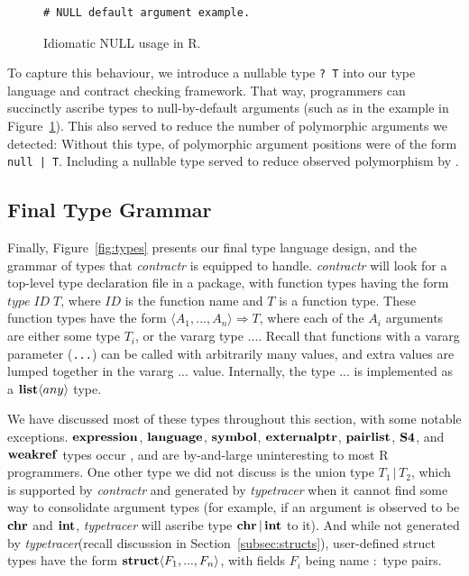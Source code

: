 \documentclass[acmsmall,review,anonymous]{acmart}\settopmatter{printfolios=true,printccs=false,printacmref=false}
\newcommand{\code}[1]{{\lstinline[style=Rin]!#1!}\xspace}
\newcommand{\contractr}{\emph{contractr}\xspace} %
\newcommand{\typetracer}{\emph{typetracer}\xspace} %
\begin{document}
\begin{figure}[htbp]
\begin{center}

\begin{lstlisting}
# NULL default argument example. 
\end{lstlisting}

\caption{Idiomatic NULL usage in R.}
\label{fig:null}
\end{center}
\end{figure}

To capture this behaviour, we introduce a nullable type \code{? T} into our type language and contract checking framework.
That way, programmers can succinctly ascribe types to null-by-default arguments (such as in the example in Figure~\ref{fig:null}).
This also served to reduce the number of polymorphic arguments we detected:
Without this type,  of polymorphic argument positions were of the form \code{null | T}.
Including a nullable type served to reduce observed polymorphism by . 

%
%
%
%
\subsection{Final Type Grammar}

Finally, Figure~\ref{fig:types} presents our final type language design, and the grammar of types that \contractr is equipped to handle.
\contractr will look for a top-level type declaration file in a package, with function types having the form $type \; ID \; T$, where $ID$ is the function name and $T$ is a function type.
These function types have the form $\langle A_1 , ..., A_n\rangle \Rightarrow T$, where each of the $A_i$ arguments are either some type $T_i$, or the vararg type $...$.
Recall that functions with a vararg parameter (\code{...}) can be called with arbitrarily many values, and extra values are lumped together in the vararg $...$ value.
Internally, the type $...$ is implemented as a ${\bf list} \langle any \rangle$ type.

We have discussed most of these types throughout this section, with some notable exceptions.
${\bf expression}$, ${\bf language}$, ${\bf symbol}$, ${\bf externalptr}$, ${\bf pairlist}$, ${\bf S4}$, and ${\bf weakref}$ types occur , and are by-and-large uninteresting to most R programmers.
One other type we did not discuss is the union type $T_1 \, | \, T_2$, which is supported by \contractr and generated by \typetracer when it cannot find some way to consolidate argument types (for example, if an argument is observed to be ${\bf chr}$ and ${\bf int}$, \typetracer will ascribe type ${\bf chr} \, | \, {\bf int}$ to it).
And while not generated by \typetracer (recall discussion in Section~\ref{subsec:structs}), user-defined struct types have the form ${\bf struct}\langle F_1, ..., F_n \rangle$, with fields $F_i$ being name $:$ type pairs.
\end{document}
